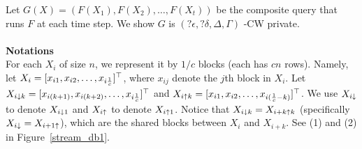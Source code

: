 \documentclass[11pt]{article}
\begin{document}
Let $G(X) = (F(X_{1}), F(X_{2}) , \dots, F(X_{t}))$ be the composite query that runs $F$ at each time step. We show $G$ is $(? \epsilon, ? \delta, \Delta, \Gamma)$ -CW private.
\\
\\
{\bf Notations }\\
For each $X_i$ of size $n$, we represent it by $1/c$ blocks (each has $cn$ rows). Namely, let $X_{i}=[x_{i 1}, x_{i 2} , \dots, x_{i \frac{1}{c}}]^{\top}$, where $x_{ij}$ denote the $j$th block in $X_{i}$. Let $X_{i \downarrow k} = [x_{i (k+1)}, x_{i (k+2)} , \dots, x_{i \frac{1}{c}}]^{\top}$ and $X_{i \uparrow k} = [x_{i 1}, x_{i2} , \dots, x_{i (\frac{1}{c}-k)}]^{\top}$. We use $X_{i \downarrow}$ to denote $X_{i \downarrow 1}$ and $X_{i \uparrow}$ to denote $X_{i \uparrow 1}$. Notice that $X_{i \downarrow k} = X_{i+k \uparrow k}$ (specifically $X_{i \downarrow} = X_{i+1 \uparrow}$), which are the shared blocks between $X_{i}$ and $X_{i+k}$. See (1) and (2) in Figure~\ref{stream_db1}.
\end{document}
